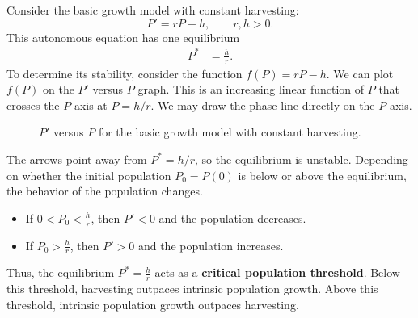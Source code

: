 \documentclass[10pt,letterpaper]{article}
\begin{document}
Consider the basic growth model with constant harvesting:
\[
P'=rP-h,
\qquad r,h>0.
\]
This autonomous equation has one equilibrium 
\begin{align*}
P^* &= \frac{h}{r}.
\end{align*}
To determine its stability, consider the function $f(P)=rP-h$. We can plot $f(P)$ on the $P'$ versus $P$ graph. This is an increasing linear function of $P$ that crosses the $P$-axis at $P=h/r$. We may draw the phase line directly on the $P$-axis.
\begin{figure}[H]
\centering
{}
\caption{$P'$ versus $P$ for the basic growth model with constant harvesting.}
\end{figure}
The arrows point away from $P^*=h/r$, so the equilibrium is unstable. Depending on whether the initial population $P_0=P(0)$ is below or above the equilibrium, the behavior of the population changes. 
\begin{itemize}
    \item If $0<P_0<\frac{h}{r}$, then $P'<0$ and the population decreases. 
    \item If $P_0>\frac{h}{r}$, then $P'>0$ and the population increases.
\end{itemize}
Thus, the equilibrium $P^*=\frac{h}{r}$ acts as a \textbf{critical population threshold}. Below this threshold, harvesting outpaces intrinsic population growth. Above this threshold, intrinsic population growth outpaces harvesting.



\end{document}
